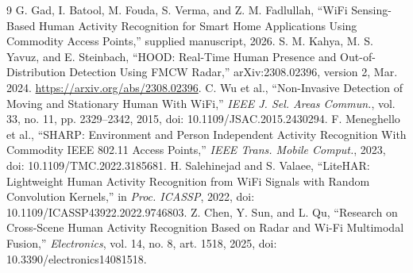 \documentclass[conference,10pt,letterpaper]{IEEEtran}
\begin{document}
\begin{thebibliography}{9}
 G. Gad, I. Batool, M. Fouda, S. Verma, and Z. M. Fadlullah, ``WiFi Sensing-Based Human Activity Recognition for Smart Home Applications Using Commodity Access Points,'' supplied manuscript, 2026.
 S. M. Kahya, M. S. Yavuz, and E. Steinbach, ``HOOD: Real-Time Human Presence and Out-of-Distribution Detection Using FMCW Radar,'' arXiv:2308.02396, version 2, Mar. 2024. \url{https://arxiv.org/abs/2308.02396}.
 C. Wu et al., ``Non-Invasive Detection of Moving and Stationary Human With WiFi,'' \emph{IEEE J. Sel. Areas Commun.}, vol. 33, no. 11, pp. 2329--2342, 2015, doi: 10.1109/JSAC.2015.2430294.
 F. Meneghello et al., ``SHARP: Environment and Person Independent Activity Recognition With Commodity IEEE 802.11 Access Points,'' \emph{IEEE Trans. Mobile Comput.}, 2023, doi: 10.1109/TMC.2022.3185681.
 H. Salehinejad and S. Valaee, ``LiteHAR: Lightweight Human Activity Recognition from WiFi Signals with Random Convolution Kernels,'' in \emph{Proc. ICASSP}, 2022, doi: 10.1109/ICASSP43922.2022.9746803.
 Z. Chen, Y. Sun, and L. Qu, ``Research on Cross-Scene Human Activity Recognition Based on Radar and Wi-Fi Multimodal Fusion,'' \emph{Electronics}, vol. 14, no. 8, art. 1518, 2025, doi: 10.3390/electronics14081518.
\end{thebibliography}
\end{document}
